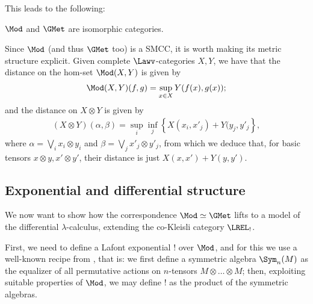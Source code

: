 This leads to the following:


\begin{theorem}
$\Mod$ and $\GMet$ are isomorphic categories.
\end{theorem}


Since $\Mod$ (and thus $\GMet$ too) is a SMCC, it is worth making its metric structure explicit. Given complete $\Lawv$-categories $X,Y$, we have that the distance on the hom-set $\Mod(X,Y)$ is given by 
\begin{align}
\Mod(X,Y)(f,g)= \sup_{x\in X}Y(f(x),g(x));
\end{align}
and the distance on $X\otimes Y$ is given by
\begin{align}
(X\otimes Y)(\alpha, \beta)=
\sup_{i}\inf_{j}\left\{X(x_{i},x'_{j})+Y(y_{j},y'_{j}\right\},
\end{align}
 where $\alpha=\bigvee_{i}x_{i}\otimes y_{i}$ and 
$\beta=\bigvee_{j}x'_{j}\otimes y'_{j}$, 
from which we deduce that, for basic tensors
$x\otimes y, x'\otimes y'$, their distance is just $X(x,x')+Y(y,y')$.

%
%








\subsection{Exponential and differential structure}


We now want to show how the correspondence $\Mod\simeq \GMet$ lifts to a model of the differential $\lambda$-calculus, extending the co-Kleisli category $\LREL_{!}$. 

First, we need to define a Lafont exponential $!$ over $\Mod$, and for this we use a well-known recipe from \cite{Mellies2018, Manzo2013}, that is: we first define a symmetric algebra $\Sym_{n}(M)$ as the equalizer of all permutative actions on $n$-tensors $M\otimes \dots \otimes M$; then, exploiting suitable properties of $\Mod$, we may define $!$ as the product of the symmetric algebras.  

